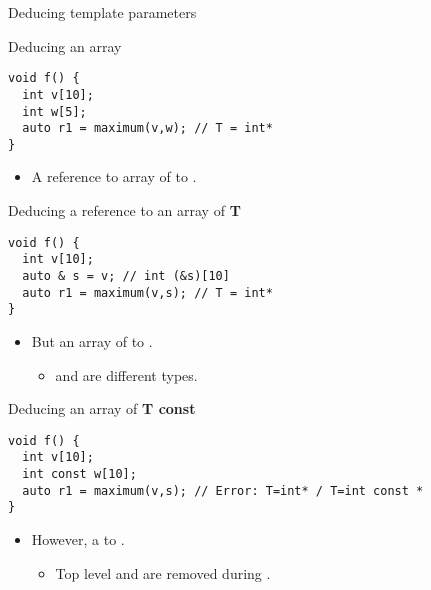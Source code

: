 \begin{frame}{Deducing template parameters}
\begin{block}{Deducing an array}
\begin{lstlisting}
void f() {
  int v[10];
  int w[5];
  auto r1 = maximum(v,w); // T = int*
}
\end{lstlisting}
\end{block}

\framebreak

\begin{itemize}
  \item A reference to array of   to .
\end{itemize}

\begin{block}{Deducing a reference to an array of \textbf{T}}
\begin{lstlisting}
void f() {
  int v[10];
  auto & s = v; // int (&s)[10]
  auto r1 = maximum(v,s); // T = int*
}
\end{lstlisting}
\end{block}

\framebreak

\begin{itemize}
  \item But an array of   to .
    \begin{itemize}
      \item {} and  are different types.
    \end{itemize}
\end{itemize}

\begin{block}{Deducing an array of \textbf{T const}}
\begin{lstlisting}
void f() {
  int v[10];
  int const w[10];
  auto r1 = maximum(v,s); // Error: T=int* / T=int const *
}
\end{lstlisting}
\end{block}

\framebreak

\begin{itemize}
  \item However, a   to .
    \begin{itemize}
      \item Top level  and  are removed during .
    \end{itemize}
\end{itemize}


\end{frame}
